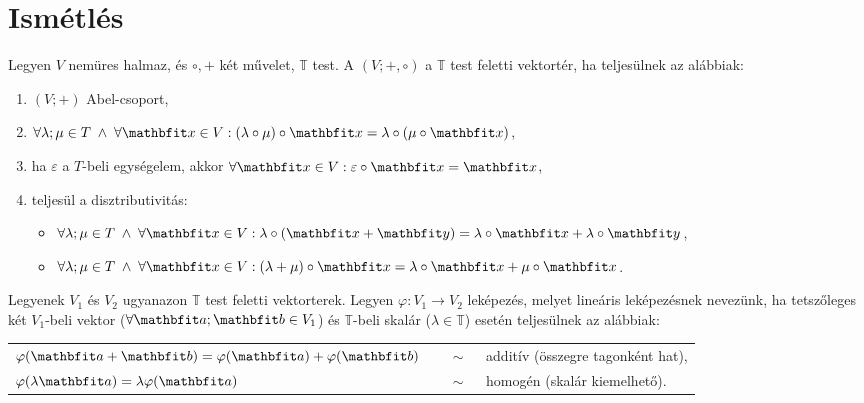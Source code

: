 \clearpage
\section{Ismétlés}

\begin{definition}[Vektortér]
  Legyen $V$ nemüres halmaz, és $\circ, +$ két művelet, $\mathbb T$ test.
  A $(V; +, \circ)$ a $\mathbb T$ test feletti vektortér, ha teljesülnek az
  alábbiak:
  \begin{enumerate}
    \item $(V; +)$ Abel-csoport,

    \item $\forall \lambda; \mu \in T \; \land \; \forall \rvec x \in V:
            (\lambda \circ \mu) \circ \rvec x
            = \lambda \circ (\mu \circ \rvec x)$,

    \item ha $\varepsilon$ a $T$-beli egységelem, akkor
          $\forall \rvec x \in V: \varepsilon \circ \rvec x = \rvec x$,

    \item teljesül a disztributivitás:
          \begin{itemize}
            \item $\forall \lambda; \mu \in T \; \land \; \forall \rvec x \in V:
                    \lambda \circ (\rvec x + \rvec y)
                    = \lambda \circ \rvec x + \lambda \circ \rvec y$,

            \item $\forall \lambda; \mu \in T \; \land \; \forall \rvec x \in V:
                    (\lambda + \mu) \circ \rvec x
                    = \lambda \circ \rvec x + \mu \circ \rvec x$.
          \end{itemize}
  \end{enumerate}
\end{definition}

\begin{definition}
  Legyenek $V_1$ és $V_2$ ugyanazon $\mathbb T$ test feletti vektorterek. Legyen
  $\varphi: V_1 \rightarrow V_2$ leképezés, melyet lineáris leképezésnek
  nevezünk, ha tetszőleges két $V_1$-beli vektor ($\forall \rvec a; \rvec b \in
    V_1$) és $\mathbb T$-beli skalár ($\lambda \in \mathbb T$) esetén teljesülnek az
  alábbiak:

  \def\arraystretch{1.5}
  \begin{tabular}{>{\bullet\;}l>{$\quad \sim \quad$}l}
    $\varphi(\rvec a + \rvec b) = \varphi(\rvec a) + \varphi(\rvec b)$
     & additív (összegre tagonként hat), \\
    $\varphi(\lambda \rvec a) = \lambda \varphi(\rvec a)$
     & homogén (skalár kiemelhető).
  \end{tabular}
\end{definition}

